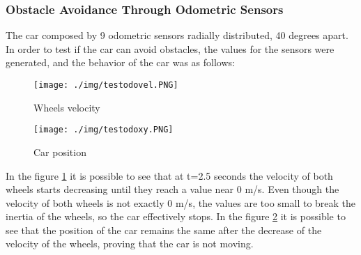 \subsubsection{Obstacle Avoidance Through Odometric Sensors}
The car composed by 9 odometric sensors radially distributed, 40 degrees apart.\\
In order to test if the car can avoid obstacles, the values for the sensors were generated, and the behavior of the car was as follows:\\
\begin{figure}[!h]
\centering
\texttt{[image: ./img/testodovel.PNG]}
\caption {\label{fig:test - odovel}Wheels velocity}
\end{figure}

\begin{figure}[!h]
\centering
\texttt{[image: ./img/testodoxy.PNG]}
\caption {\label{fig:test - odoxy}Car position}
\end{figure}

In the figure \ref{fig:test - odovel} it is possible to see that at t=2.5 seconds the velocity of both wheels starts decreasing until they reach a value near 0 m/s. Even though the velocity of both wheels is not exactly 0 m/s, the values are too small to break the inertia of the wheels, so the car effectively stops.
In the figure \ref{fig:test - odoxy} it is possible to see that the position of the car remains the same after the decrease of the velocity of the wheels, proving that the car is not moving.